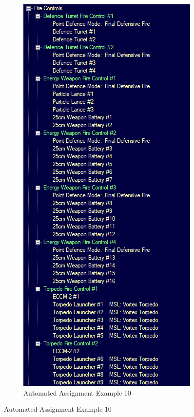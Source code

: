 \documentclass[../../Aurora C# unofficial manual.tex]{subfiles}
\begin{document}
\begin{figure}[H]
\begin{subfigure}{.5\textwidth}
			\includegraphics[width=0.5\linewidth]{images/AutomatedAssignment10}
			\caption[Automated Assignment]{Automated Assignment Example 10}
			\label{fig:automatedassignment10}
		\end{subfigure}
	\end{figure}
\end{document}
